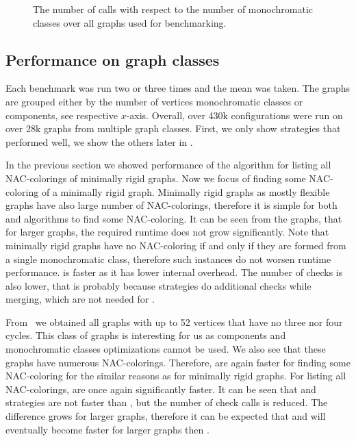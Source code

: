 \begin{figure}[ht]
	\centering
	\scalebox{0.5}{}
	\caption[The number of \IsNACColoring{} calls.]{
		The number of \IsNACColoring{} calls with respect to the number of monochromatic classes
		over all graphs used for benchmarking.}%
	\label{fig:graph_summary}
\end{figure}






\subsection{Performance on graph classes}%


Each benchmark was run two or three times and the mean was taken.
The graphs are grouped either by the number of vertices
monochromatic classes or \trcon{} components, see respective \(x\)-axis.
Overall, over 430k configurations were run
on over 28k graphs from multiple graph classes.
First, we only show strategies that performed well,
we show the others later in .

In the previous section we showed performance of the algorithm for listing
all NAC-colorings of minimally rigid graphs.
Now we focus of finding some NAC-coloring of a minimally rigid graph.
Minimally rigid graphs as mostly flexible graphs have also
large number of NAC-colorings, therefore it is simple for both \NaiveCycles{}
and \Subgraphs{} algorithms to find some NAC-coloring.
It can be seen from the graphs, that for larger graphs, the required runtime
does not grow significantly.
Note that minimally rigid graphs have no NAC-coloring if and only if they are formed from
a single monochromatic class, therefore such instances do not worsen runtime performance.
\NaiveCycles{} is faster as it has lower internal overhead.
The number of \IsNACColoring{} checks is also lower,
that is probably because \Subgraphs{} strategies do additional checks
while merging, which are not needed for \NaiveCycles{}.



From~\cite{extremal_graphs} we obtained all graphs with up to 52 vertices
that have no three nor four cycles. This class of graphs is interesting for us
as \trcon{} components and monochromatic classes optimizations cannot be used.
We also see that these graphs have numerous NAC-colorings.
Therefore, \NaiveCycles{} are again faster for finding some NAC-coloring
for the similar reasons as for minimally rigid graphs.
For listing all NAC-colorings, \Subgraphs{} are once again significantly faster.
It can be seen that \Neighbors{} and \CyclesMatchChunks{} strategies are not faster than \None{},
but the number of \IsNACColoring{} check calls is reduced.
The difference grows for larger graphs, therefore it can be expected
that \Neighbors{} and \CyclesMatchChunks{} will eventually become faster
for larger graphs then \None{}.

